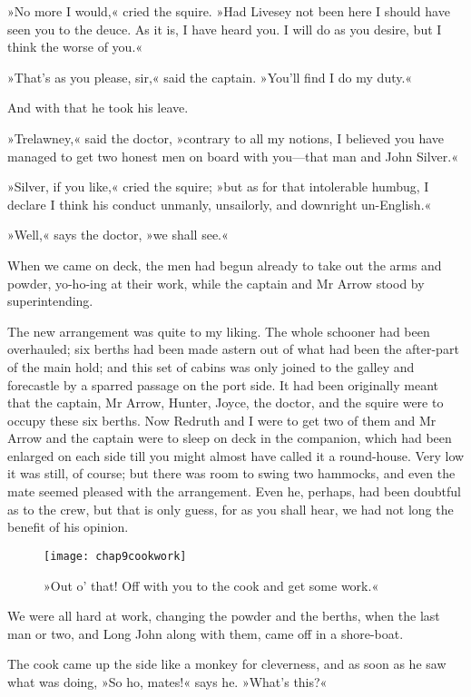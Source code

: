 »No more I would,« cried the squire. »Had Livesey not been here I should have seen you to the deuce. As it is, I have heard you. I will do as you desire, but I think the worse of you.«

»That's as you please, sir,« said the captain. »You'll find I do my duty.«

And with that he took his leave.

»Trelawney,« said the doctor, »contrary to all my notions, I believed you have managed to get two honest men on board with you—that man and John Silver.«

»Silver, if you like,« cried the squire; »but as for that intolerable humbug, I declare I think his conduct unmanly, unsailorly, and downright un-English.«

»Well,« says the doctor, »we shall see.«

When we came on deck, the men had begun already to take out the arms and powder, yo-ho-ing at their work, while the captain and Mr Arrow stood by superintending.

The new arrangement was quite to my liking. The whole schooner had been overhauled; six berths had been made astern out of what had been the after-part of the main hold; and this set of cabins was only joined to the galley and forecastle by a sparred passage on the port side. It had been originally meant that the captain, Mr Arrow, Hunter, Joyce, the doctor, and the squire were to occupy these six berths. Now Redruth and I were to get two of them and Mr Arrow and the captain were to sleep on deck in the companion, which had been enlarged on each side till you might almost have called it a round-house. Very low it was still, of course; but there was room to swing two hammocks, and even the mate seemed pleased with the arrangement. Even he, perhaps, had been doubtful as to the crew, but that is only guess, for as you shall hear, we had not long the benefit of his opinion.

\begin{figure}[p]
\centering
\texttt{[image: chap9cookwork]}
\caption[»Off with you to the cook and get some work.«]{»Out o' that! Off with you to the cook and get some work.«}
\end{figure}

We were all hard at work, changing the powder and the berths, when the last man or two, and Long John along with them, came off in a shore-boat.

The cook came up the side like a monkey for cleverness, and as soon as he saw what was doing, »So ho, mates!« says he. »What's this?«

